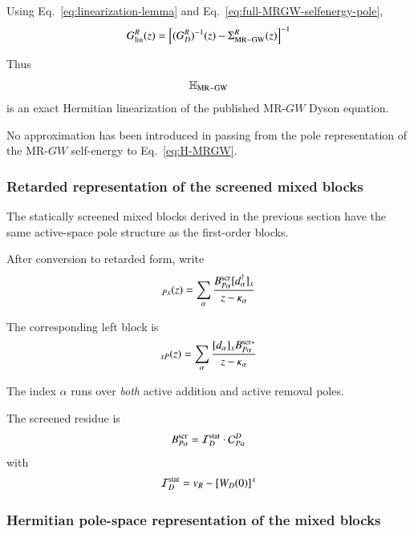 \documentclass[aip,jcp,reprint,noshowkeys,superscriptaddress]{revtex4-1}
\begin{document}
Using Eq.~\eqref{eq:linearization-lemma} and
Eq.~\eqref{eq:full-MRGW-selfenergy-pole},
\begin{equation}
  G_{\rm lin}^{R}(z)
  =
  \left[
    (G_D^R)^{-1}(z)
    -
    \Sigma_{\rm MR-GW}^{R}(z)
  \right]^{-1}
  \label{eq:linearization-equals-Dyson}
\end{equation}

Thus
\begin{equation}
  \mathbb H_{\rm MR-GW}
\end{equation}
is an exact Hermitian linearization of the published MR-$GW$ Dyson
equation.

No approximation has been introduced in passing from the pole
representation of the MR-$GW$ self-energy to
Eq.~\eqref{eq:H-MRGW}.


\subsubsection{Retarded representation of the screened mixed blocks}

The statically screened mixed blocks derived in the previous section
have the same active-space pole structure as the first-order blocks.

After conversion to retarded form, write
\begin{equation}
  [\Sigma_{\rm scr}^{12,R}]_{Px}(z)
  =
  \sum_\alpha
  \frac{
    B_{P\alpha}^{\rm scr}
    [d_\alpha^\dagger]_x
  }{
    z-\kappa_\alpha
  }
  \label{eq:sigma12-retarded-B}
\end{equation}

The corresponding left block is
\begin{equation}
  [\Sigma_{\rm scr}^{21,R}]_{xP}(z)
  =
  \sum_\alpha
  \frac{
    [d_\alpha]_x
    B_{P\alpha}^{{\rm scr}*}
  }{
    z-\kappa_\alpha
  }
  \label{eq:sigma21-retarded-B}
\end{equation}

The index $\alpha$ runs over \emph{both} active addition and active
removal poles.

The screened residue is
\begin{equation}
  B_{P\alpha}^{\rm scr}
  =
  \mathcal I_D^{\rm stat}
  \cdot
  \mathcal C_{P\alpha}^{D}
\end{equation}
with
\begin{equation}
  \mathcal I_D^{\rm stat}
  =
  v_R-[W_D(0)]^x
\end{equation}


\subsubsection{Hermitian pole-space representation of the mixed blocks}
\end{document}

